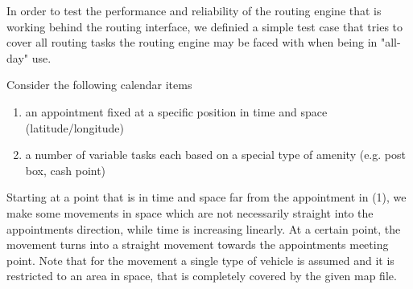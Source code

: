 In order to test the performance and reliability of the routing engine that is working behind the routing interface, we definied a simple test case that tries to cover all routing tasks the routing engine may be faced with when being in "all-day" use.\newline

Consider the following calendar items
\begin{enumerate}
	\item an appointment fixed at a specific position in time and space (latitude/longitude)
	\item a number of variable tasks each based on a special type of amenity (e.g. post box, cash point)
\end{enumerate}

Starting at a point that is in time and space far from the appointment in (1), we make some movements in space which are not necessarily straight into the appointments direction, while time is increasing linearly. At a certain point, the movement turns into a straight movement towards the appointments meeting point. Note that for the movement a single type of vehicle is assumed and it is restricted to an area in space, that is completely covered by the given map file.\newline

